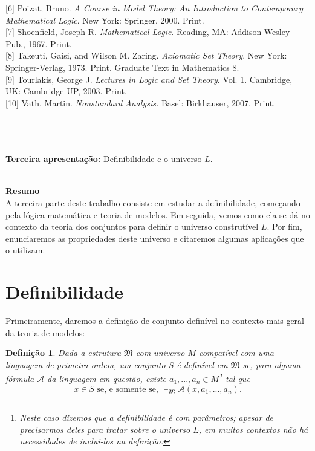 \documentclass[11pt,a4paper]{article}
\newtheorem{mydef}{Definição}[section]
\theoremstyle{definition}
\begin{document}
[6] Poizat, Bruno. \textit{A Course in Model Theory: An Introduction to Contemporary Mathematical Logic}. New York: Springer, 2000. Print. \\

[7] Shoenfield, Joseph R. \textit{Mathematical Logic}. Reading, MA: Addison-Wesley Pub., 1967. Print. \\

[8] Takeuti, Gaisi, and Wilson M. Zaring. \textit{Axiomatic Set Theory}. New York: Springer-Verlag, 1973. Print. Graduate Text in Mathematics 8. \\

[9] Tourlakis, George J. \textit{Lectures in Logic and Set Theory}. Vol. 1. Cambridge, UK: Cambridge UP, 2003. Print. \\

[10] Vath, Martin. \textit{Nonstandard Analysis.} Basel: Birkhauser, 2007. Print.



\ \\

\ \\

\ \\


{\Large  \textbf{Terceira apresentação:} Definibilidade e o universo $L$.}

\ \\

{\Large \textbf{Resumo}}  \\


{\small A terceira parte deste trabalho consiste em estudar a definibilidade, começando pela lógica matemática e teoria de modelos. Em seguida, vemos como ela se dá no contexto da teoria dos conjuntos para definir o universo construtível $L$. Por fim, enunciaremos as propriedades deste universo e citaremos algumas aplicações que o utilizam.}

\section{Definibilidade}

Primeiramente, daremos a definição de conjunto definível no contexto mais geral da teoria de modelos:

\begin{mydef}
    
    Dada a estrutura $\mathfrak{M}$ com universo $M$ compatível com uma linguagem de primeira ordem, um conjunto $S$ é definível em $\mathfrak{M}$ se, para alguma fórmula $\mathscr{A}$ da linguagem em questão,  existe $a_1,...,a_n\in M$\footnote{Neste caso dizemos que a definibilidade é com parâmetros; apesar de precisarmos deles para tratar sobre o universo $L$, em muitos contextos não há necessidades de inclui-los na definição.} tal que $$x\in S \text{ se, e somente se, } \vDash_{\mathfrak{M}} \mathscr{A}(x,a_1,...,a_n).$$
    
\end{mydef}
\end{document}
